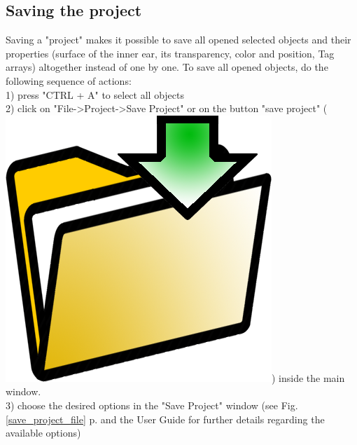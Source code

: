 \documentclass[12pt, a4paper]{book}
\begin{document}
\subsection{Saving the project}
Saving a "project" makes it possible to save all opened selected objects and their properties (surface of the inner ear, its transparency, color and position, Tag arrays) altogether instead of one by one. 
To save all opened objects, do the following sequence of actions:\\
1) press "CTRL + A" to select all objects\\
2) click on "File->Project->Save Project" or on the button "save project" (\includegraphics[scale=0.03]{../images/03/save_data.png})  inside the main window.\\
3) choose the desired options in the "Save Project" window (see Fig. \ref{save_project_file} p.\pageref{save_project_file} and the User Guide for further details regarding the available options)
\end{document}
